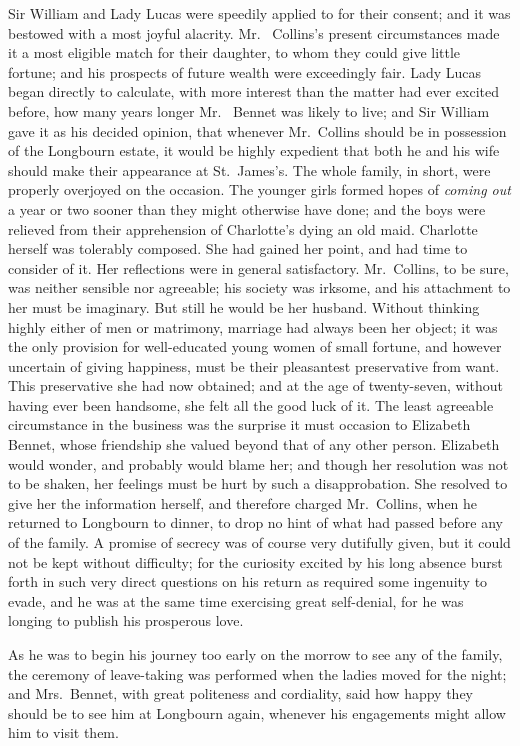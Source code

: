 Sir William and Lady Lucas were speedily applied to for their
consent; and it was bestowed with a most joyful alacrity.  Mr.\ %
Collins's present circumstances made it a most eligible match for
their daughter, to whom they could give little fortune; and his
prospects of future wealth were exceedingly fair.  Lady Lucas
began directly to calculate, with more interest than the
matter had ever excited before, how many years longer Mr.\ %
Bennet was likely to live; and Sir William gave it as his decided
opinion, that whenever Mr.\ Collins should be in possession of the
Longbourn estate, it would be highly expedient that both he and
his wife should make their appearance at St.\ James's.  The whole
family, in short, were properly overjoyed on the occasion.
The younger girls formed hopes of \emph{coming out} a year or two
sooner than they might otherwise have done; and the boys were
relieved from their apprehension of Charlotte's dying an old
maid.  Charlotte herself was tolerably composed.  She had
gained her point, and had time to consider of it.  Her reflections
were in general satisfactory.  Mr.\ Collins, to be sure, was
neither sensible nor agreeable; his society was irksome, and his
attachment to her must be imaginary.  But still he would be her
husband.  Without thinking highly either of men or matrimony,
marriage had always been her object; it was the only provision
for well-educated young women of small fortune, and however
uncertain of giving happiness, must be their pleasantest
preservative from want.  This preservative she had now
obtained; and at the age of twenty-seven, without having ever
been handsome, she felt all the good luck of it.  The least
agreeable circumstance in the business was the surprise it must
occasion to Elizabeth Bennet, whose friendship she valued
beyond that of any other person.  Elizabeth would wonder, and
probably would blame her; and though her resolution was not to
be shaken, her feelings must be hurt by such a disapprobation.
She resolved to give her the information herself, and therefore
charged Mr.\ Collins, when he returned to Longbourn to dinner,
to drop no hint of what had passed before any of the family.  A
promise of secrecy was of course very dutifully given, but it
could not be kept without difficulty; for the curiosity excited
by his long absence burst forth in such very direct questions on
his return as required some ingenuity to evade, and he was at the
same time exercising great self-denial, for he was longing to
publish his prosperous love.

As he was to begin his journey too early on the morrow to see
any of the family, the ceremony of leave-taking was performed
when the ladies moved for the night; and Mrs.\ Bennet, with
great politeness and cordiality, said how happy they should be
to see him at Longbourn again, whenever his engagements might
allow him to visit them.

